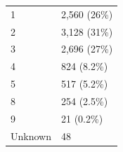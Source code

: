 \documentclass[]{article}
\begin{document}
\begin{longtable}[]{@{}ll@{}}
\begin{minipage}[t]{0.71\columnwidth}\raggedright
1\strut
\end{minipage} & \begin{minipage}[t]{0.23\columnwidth}\raggedright
2,560 (26\%)\strut
\end{minipage}\tabularnewline
\begin{minipage}[t]{0.71\columnwidth}\raggedright
2\strut
\end{minipage} & \begin{minipage}[t]{0.23\columnwidth}\raggedright
3,128 (31\%)\strut
\end{minipage}\tabularnewline
\begin{minipage}[t]{0.71\columnwidth}\raggedright
3\strut
\end{minipage} & \begin{minipage}[t]{0.23\columnwidth}\raggedright
2,696 (27\%)\strut
\end{minipage}\tabularnewline
\begin{minipage}[t]{0.71\columnwidth}\raggedright
4\strut
\end{minipage} & \begin{minipage}[t]{0.23\columnwidth}\raggedright
824 (8.2\%)\strut
\end{minipage}\tabularnewline
\begin{minipage}[t]{0.71\columnwidth}\raggedright
5\strut
\end{minipage} & \begin{minipage}[t]{0.23\columnwidth}\raggedright
517 (5.2\%)\strut
\end{minipage}\tabularnewline
\begin{minipage}[t]{0.71\columnwidth}\raggedright
8\strut
\end{minipage} & \begin{minipage}[t]{0.23\columnwidth}\raggedright
254 (2.5\%)\strut
\end{minipage}\tabularnewline
\begin{minipage}[t]{0.71\columnwidth}\raggedright
9\strut
\end{minipage} & \begin{minipage}[t]{0.23\columnwidth}\raggedright
21 (0.2\%)\strut
\end{minipage}\tabularnewline
\begin{minipage}[t]{0.71\columnwidth}\raggedright
Unknown\strut
\end{minipage} & \begin{minipage}[t]{0.23\columnwidth}\raggedright
48\strut
\end{minipage}\tabularnewline

\end{longtable}
\end{document}
